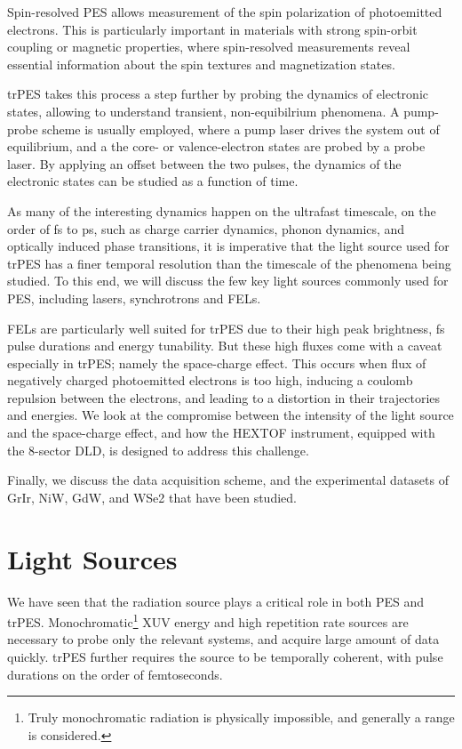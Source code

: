 Spin-resolved \gls{PES} allows measurement of the spin polarization of photoemitted electrons. This is particularly important in materials with strong spin-orbit coupling or magnetic properties, where spin-resolved measurements reveal essential information about the spin textures and magnetization states.

\gls{trPES} takes this process a step further by probing the dynamics of electronic states, allowing to understand transient, non-equibilrium phenomena. A pump-probe scheme is usually employed, where a pump laser drives the system out of equilibrium, and a the core- or valence-electron states are probed by a probe laser. By applying an offset between the two pulses, the dynamics of the electronic states can be studied as a function of time.

As many of the interesting dynamics happen on the ultrafast timescale, on the order of \unit{fs} to \unit{ps}, such as charge carrier dynamics, phonon dynamics, and optically induced phase transitions, it is imperative that the light source used for \gls{trPES} has a finer temporal resolution than the timescale of the phenomena being studied. To this end, we will discuss the few key light sources commonly used for \gls{PES}, including lasers, synchrotrons and \glspl{FEL}.

\Glspl{FEL} are particularly well suited for \gls{trPES} due to their high peak brightness, \unit{fs} pulse durations and energy tunability. But these high fluxes come with a caveat especially in \gls{trPES}; namely the space-charge effect. This occurs when flux of negatively charged photoemitted electrons is too high, inducing a coulomb repulsion between the electrons, and leading to a distortion in their trajectories and energies. We look at the compromise between the intensity of the light source and the space-charge effect, and how the \gls{HEXTOF} instrument, equipped with the \num{8}-sector \gls{DLD}, is designed to address this challenge.

Finally, we discuss the data acquisition scheme, and the experimental datasets of \gls{GrIr}, \gls{NiW}, \gls{GdW}, and \gls{WSe2} that have been studied.

\section{Light Sources}\label{section:light-sources}
We have seen that the radiation source plays a critical role in both \gls{PES} and \gls{trPES}. Monochromatic\footnote{Truly monochromatic radiation is physically impossible, and generally a range is considered.} \gls{XUV} energy and high repetition rate sources are necessary to probe only the relevant systems, and acquire large amount of data quickly. \Gls{trPES} further requires the source to be temporally coherent, with pulse durations on the order of femtoseconds.

